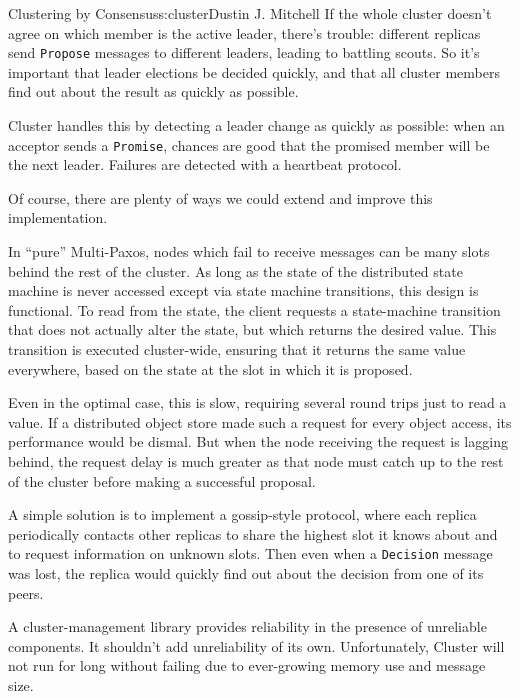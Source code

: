 \begin{aosachapter}{Clustering by Consensus}{s:cluster}{Dustin J. Mitchell}
If the whole cluster doesn't agree on which member is the active leader,
there's trouble: different replicas send \texttt{Propose} messages to
different leaders, leading to battling scouts. So it's important that
leader elections be decided quickly, and that all cluster members find
out about the result as quickly as possible.

Cluster handles this by detecting a leader change as quickly as
possible: when an acceptor sends a \texttt{Promise}, chances are good
that the promised member will be the next leader. Failures are detected
with a heartbeat protocol.

\label{further-extensions}

Of course, there are plenty of ways we could extend and improve this
implementation.

\label{catching-up}

In ``pure'' Multi-Paxos, nodes which fail to receive messages can be
many slots behind the rest of the cluster. As long as the state of the
distributed state machine is never accessed except via state machine
transitions, this design is functional. To read from the state, the
client requests a state-machine transition that does not actually alter
the state, but which returns the desired value. This transition is
executed cluster-wide, ensuring that it returns the same value
everywhere, based on the state at the slot in which it is proposed.

Even in the optimal case, this is slow, requiring several round trips
just to read a value. If a distributed object store made such a request
for every object access, its performance would be dismal. But when the
node receiving the request is lagging behind, the request delay is much
greater as that node must catch up to the rest of the cluster before
making a successful proposal.

A simple solution is to implement a gossip-style protocol, where each
replica periodically contacts other replicas to share the highest slot
it knows about and to request information on unknown slots. Then even
when a \texttt{Decision} message was lost, the replica would quickly
find out about the decision from one of its peers.

\label{consistent-memory-usage}

A cluster-management library provides reliability in the presence of
unreliable components. It shouldn't add unreliability of its own.
Unfortunately, Cluster will not run for long without failing due to
ever-growing memory use and message size.


\end{aosachapter}
